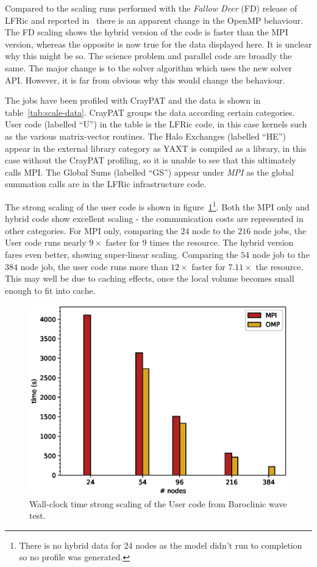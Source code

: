 Compared to the scaling runs performed with the {\em Fallow Deer} (FD)
release of LFRic and reported in~\cite{LFRic} there is an apparent
change in the OpenMP behaviour. The FD scaling shows the hybrid version of
the code is faster than the MPI version, whereas the opposite is now
true for the data displayed here. It is unclear why this might be
so. The science problem and parallel code are broadly the same. The
major change is to the solver algorithm which uses the new solver
API. However, it is far from obvious why this would change the
behaviour.

The jobs have been profiled with CrayPAT and the data is shown in
table~\ref{tab:scale-data}. CrayPAT groups the data according certain
categories. User code (labelled ``U'') in the table is the LFRic
code, in this case kernels such as the various matrix-vector
routines. The Halo Exchanges (labelled ``HE'') appear in the external library
category as YAXT is compiled as a library, in this case without the
CrayPAT profiling, so it is unable to see that this ultimately calls
MPI. The Global Sums (labelled ``GS'') appear under {\em MPI} as the
global summation calls are in the LFRic infrastructure code.

The strong scaling of the user code is shown in
figure~\ref{fig:U_scale}\footnote{There is no hybrid data for 24 nodes
  as the model didn't run to completion so no profile was generated.}.
Both the MPI only and hybrid code show excellent scaling - the
communication costs are represented in other categories. For MPI
only, comparing the $24$ node to the $216$ node jobs, the User code
runs nearly $9\times$ faster for $9$ times the resource. The hybrid
version fares even better, showing super-linear scaling. Comparing the
$54$ node job to the $384$ node job, the user code runs more than
$12\times$ faster for $7.11\times$ the resource. This may well be due
to caching effects, once the local volume becomes small enough to fit
into cache.


\begin{figure}[ht!]
\centering\includegraphics[width=1.0\linewidth]{figs/U-scale.eps}
\caption{\label{fig:U_scale}Wall-clock time strong scaling of the 
  User code from Baroclinic wave test.}
\end{figure} 


